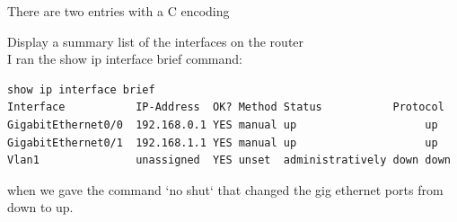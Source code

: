 \documentclass[../EngineeringJournal_CDavis.tex]{subfiles}
\begin{document}
There are two entries with a C encoding

Display a summary list of the interfaces on the router
\\I ran the show ip interface brief command:

\begin{mdframed}
\scriptsize
\begin{verbatim}
show ip interface brief
Interface           IP-Address  OK? Method Status           Protocol 
GigabitEthernet0/0  192.168.0.1 YES manual up                    up 
GigabitEthernet0/1  192.168.1.1 YES manual up                    up 
Vlan1               unassigned  YES unset  administratively down down
\end{verbatim}
\normalsize
\end{mdframed}

when we gave the command `no shut` that changed the gig ethernet ports from down to up.
\end{document}
